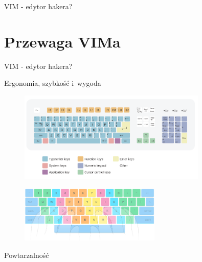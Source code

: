 \documentclass{beamer}
\begin{document}
\begin{frame}[t]{VIM - edytor hakera?}
\end{frame}

\section{Przewaga VIMa}
\label{sec:Przewaga VIMa}

\begin{frame}[t]{VIM - edytor hakera?}
\end{frame}

\begin{frame}[t]{Ergonomia, szybkość i~wygoda}
\begin{figure}
\centering
\vspace{-15pt}
\includegraphics[width=0.8\textwidth]{images/full_keyboard}
\end{figure}
\begin{figure}
\centering
\vspace{-10pt}
\includegraphics[width=0.6\textwidth]{images/edu_keyboard}
\end{figure}
\end{frame}

\begin{frame}[t]{Powtarzalność}
  
\end{frame}
\end{document}
